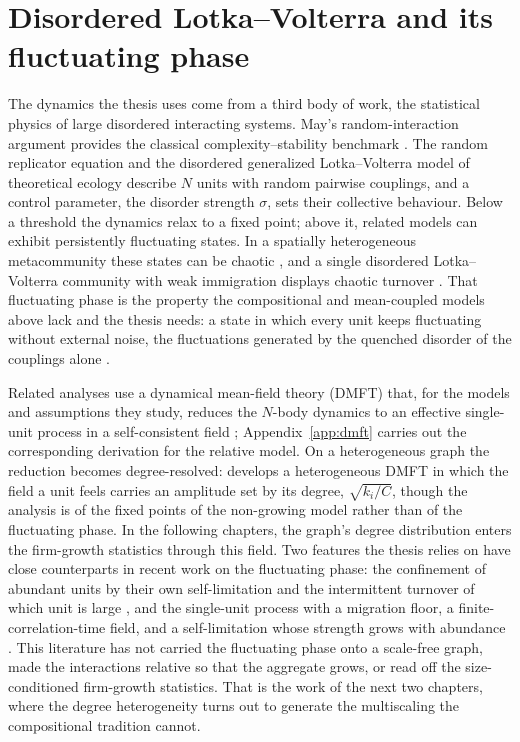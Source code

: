\section{Disordered Lotka--Volterra and its fluctuating phase}
\label{sec:bg-glv}

The dynamics the thesis uses come from a third body of work, the statistical physics of large
disordered interacting systems. May's random-interaction argument provides the classical
complexity--stability benchmark \citep{may1972}. The random replicator equation \citep{diederich1989,
opperdiederich1992} and the disordered generalized Lotka--Volterra model of theoretical ecology
\citep{bunin2017} describe $N$ units with random pairwise couplings, and a control parameter,
the disorder strength $\sigma$, sets their collective behaviour. Below a threshold the dynamics
relax to a fixed point; above it, related models can exhibit persistently fluctuating states. In a
spatially heterogeneous metacommunity these states can be chaotic \citep{roy2020}, and a single
disordered Lotka--Volterra community with weak immigration displays chaotic turnover
\citep{mallmin2024}. That fluctuating
phase is the property the compositional and mean-coupled models above lack and the thesis
needs: a state in which every unit keeps fluctuating without external noise, the fluctuations
generated by the quenched disorder of the couplings alone \citep{roy2020}.

Related analyses use a dynamical mean-field theory (DMFT) that, for the models and assumptions
they study, reduces the $N$-body dynamics to an effective single-unit process in a self-consistent
field \citep{galla2018, roy2020}; Appendix~\ref{app:dmft} carries out the corresponding
derivation for the relative model. On a
heterogeneous graph the reduction becomes degree-resolved: \citet{aguirrelopez} develops a
heterogeneous DMFT in which the field a unit feels carries an amplitude set by its degree,
$\sqrt{k_i/C}$, though the analysis is of the fixed points of the non-growing model rather than
of the fluctuating phase. In the following chapters, the graph's degree distribution enters the firm-growth
statistics through this field. Two
features the thesis relies on have close counterparts in recent work on the fluctuating phase:
the confinement of abundant units by their own self-limitation and the intermittent turnover of
which unit is large \citep{mallmin2024}, and the single-unit process with a migration floor, a
finite-correlation-time field, and a self-limitation whose strength grows with abundance
\citep{arnouxbunin2024}. This literature has not carried the fluctuating phase onto a
scale-free graph, made the interactions relative so that the aggregate grows, or read off the
size-conditioned firm-growth statistics. That is the work of the next two chapters,
where the degree heterogeneity turns out to generate the multiscaling the compositional
tradition cannot.

